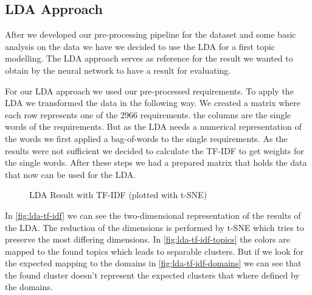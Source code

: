 \subsection{LDA Approach} %
\label{sub:own_lda}

After we developed our pre-processing pipeline for the dataset and some basic analysis on the data we have we decided to use the LDA for a first topic modelling. The LDA approach serves as reference for the result we wanted to obtain by the neural network to have a result for evaluating.


For our LDA approach we used our pre-processed requirements. To apply the LDA we transformed the data in the following way. We created a matrix where each row represents one of the 2966 requirements. the columns are the single words of the requirements. But as the LDA needs a numerical representation of the words we first applied a bag-of-words to the single requirements. As the results were not sufficient we decided to calculate the TF-IDF to get weights for the single words. After these steps we had a prepared matrix that holds the data that now can be used for the LDA.

\begin{figure}[bht]
    \caption{LDA Result with TF-IDF (plotted with t-SNE)} \label{fig:lda-tf-idf}
\end{figure}
\FloatBarrier

In \autoref{fig:lda-tf-idf} we can see the two-dimensional representation of the results of the LDA. The reduction of the dimensions is performed by t-SNE which tries to preserve the most differing dimensions. In \autoref{fig:lda-tf-idf-topics} the colors are mapped to the found topics which leads to separable clusters. But if we look for the expected mapping to the domains in \autoref{fig:lda-tf-idf-domains} we can see that the found cluster doesn't represent the expected clusters that where defined by the domains.